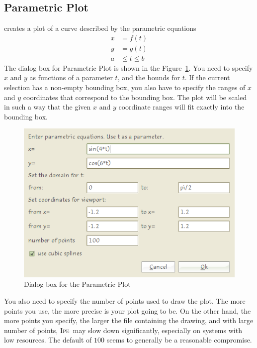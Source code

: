 \documentclass{article}
\def\Ipe{\textsc{Ipe}}
\begin{document}
\subsection{Parametric Plot}
creates a plot of a curve described by the parametric equations
\begin{align*}
   x &= f(t)\\
   y &= g(t)\\
   a &\le t \le b
\end{align*}
The dialog box for Parametric Plot is shown in the
Figure~\ref{fig:param_dialog}. You need to specify $x$ and $y$ as functions of
a parameter $t$, and the bounds for $t$. If the current selection has a
non-empty bounding box, you also have to specify the ranges of $x$ and $y$
coordinates that correspond to the bounding box.  The plot will be scaled in
such a way that the given $x$ and $y$ coordinate ranges will fit exactly into
the bounding box. 

\begin{figure}[h]
   \begin{center}
      \includegraphics[scale=3]{param_dialog.png}
   \end{center}
   \caption{Dialog box for the Parametric Plot}
   \label{fig:param_dialog}
\end{figure}

You also need to specify the number of points used to draw the plot.  The more
points you use, the more precise is your plot going to be.  On the other hand,
the more points you specify, the larger the file containing the drawing, and
with large number of points, \Ipe\ may slow down significantly, especially on
systems with low resources. The default of $100$ seems to generally be a
reasonable compromise.
\end{document}
